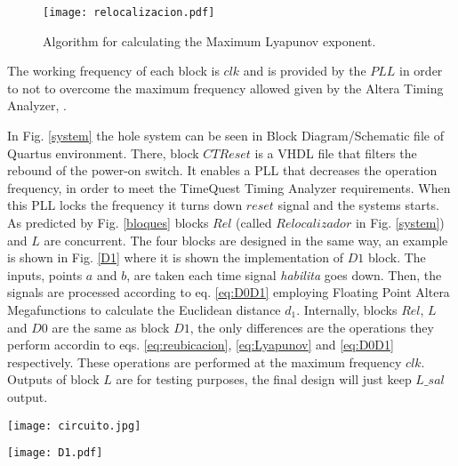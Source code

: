\begin{figure}
    \centering
    \texttt{[image: relocalizacion.pdf]}\\
    \caption{Algorithm for calculating the Maximum Lyapunov exponent.}\label{fig:relocalizacion}
\end{figure}

 The working frequency of each
block is $clk$ and is provided by the $PLL$ in order to not to
overcome the maximum frequency allowed given by the Altera Timing
Analyzer, \cite{TimingALTERA}.

 In Fig. \ref{system} the hole system can be seen in Block Diagram/Schematic file of Quartus
 environment. There, block  $CTReset$ is a VHDL file that filters the rebound of
the power-on switch. It enables a PLL that decreases the operation
frequency, in order to meet the TimeQuest Timing Analyzer
 requirements. When this PLL locks the frequency it turns down $reset$ signal and the systems starts. As predicted by Fig.
\ref{bloques} blocks $Rel$ (called $Relocalizador$ in Fig.
\ref{system}) and $L$ are concurrent. The four blocks are designed
in the same way, an example is shown in Fig. \ref{D1} where it is
shown the implementation of $D1$ block. The inputs, points $a$ and
$b$, are taken each time signal \textit{habilita} goes down. Then,
the signals are processed according to eq. \ref{eq:D0D1} employing
Floating Point Altera Megafunctions \cite{ALTERAMEGAFUNCTIONS} to
calculate the Euclidean distance $d_1$. Internally, blocks $Rel$,
$L$ and $D0$ are the same as block $D1$, the only differences are
the operations they perform accordin to eqs. \ref{eq:reubicacion},
\ref{eq:Lyapunov} and \ref{eq:D0D1} respectively. These operations
are performed at the maximum frequency $clk$. Outputs of block $L$
are for testing purposes, the final design will just keep $L\_sal$
output.

\begin{figure*}
    \centering
    \texttt{[image: circuito.jpg]}\\
    \caption{Hole System in Block Diagram/Schematic file of Quartus environment.}\label{system}
\end{figure*}


\begin{figure*}
    \centering
    \texttt{[image: D1.pdf]}\\
    \caption{$D_1$ block in Block Diagram/Schematic file of Quartus environment.}\label{D1}
\end{figure*}

